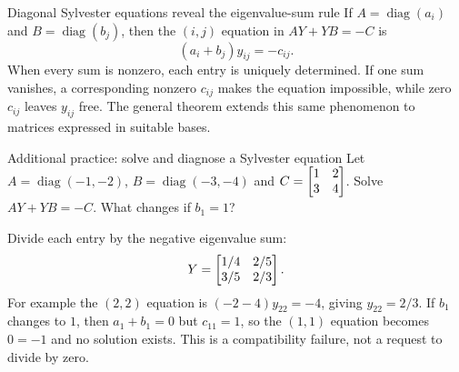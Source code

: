 \begin{method}{Diagonal Sylvester equations reveal the eigenvalue-sum rule}
If $A=\operatorname{diag}(a_i)$ and $B=\operatorname{diag}(b_j)$, then the $(i,j)$ equation in $AY+YB=-C$ is
\[(a_i+b_j)y_{ij}=-c_{ij}.\]
When every sum is nonzero, each entry is uniquely determined. If one sum vanishes, a corresponding nonzero $c_{ij}$ makes the equation impossible, while zero $c_{ij}$ leaves $y_{ij}$ free. The general theorem extends this same phenomenon to matrices expressed in suitable bases.
\end{method}
\begin{question}{Additional practice: solve and diagnose a Sylvester equation}
Let $A=\operatorname{diag}(-1,-2)$, $B=\operatorname{diag}(-3,-4)$ and $C=\begin{bmatrix}1&2\\3&4\end{bmatrix}$. Solve $AY+YB=-C$. What changes if $b_1=1$?
\end{question}
\begin{answer}
Divide each entry by the negative eigenvalue sum:
\[Y=\begin{bmatrix}1/4&2/5\\3/5&2/3\end{bmatrix}.\]
For example the $(2,2)$ equation is $(-2-4)y_{22}=-4$, giving $y_{22}=2/3$. If $b_1$ changes to $1$, then $a_1+b_1=0$ but $c_{11}=1$, so the $(1,1)$ equation becomes $0=-1$ and no solution exists. This is a compatibility failure, not a request to divide by zero.
\end{answer}


